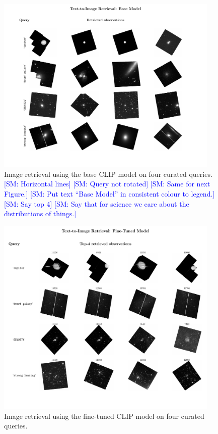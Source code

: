 \documentclass[10pt]{article} %
\newcommand{\SM}[1]{\textcolor{blue}{[SM: #1]}}
\begin{document}
\begin{figure}[!h]
\includegraphics[width=0.95\textwidth]{plots/tti_base.pdf}
\caption{Image retrieval using the base CLIP model on four curated queries. \SM{Horizontal lines} \SM{Query not rotated} \SM{Same for next Figure.} \SM{Put text ``Base Model'' in consistent colour to legend.} \SM{Say top 4} \SM{Say that for science we care about the distributions of things.}}
\label{fig:tti_base}
\end{figure}

\begin{figure}[!h]
\includegraphics[width=0.95\textwidth]{plots/tti.pdf}
\caption{Image retrieval using the fine-tuned CLIP model on four curated queries.}
\label{fig:tti}
\end{figure}
\end{document}
